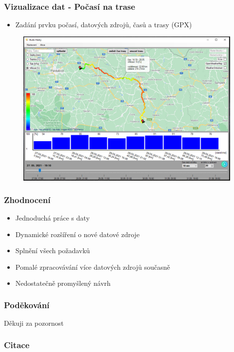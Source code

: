 \documentclass{beamer}
\begin{document}
	\begin{frame}
		\frametitle{Vizualizace dat - Počasí na trase}
		
		\begin{itemize}
			\item Zadání prvku počasí, datových zdrojů, časů a trasy (GPX)
		\end{itemize}
	
		\begin{figure}
			
			\includegraphics[scale=0.35]{figures/trasa počasí.png}
			
		\end{figure}
		
	\end{frame}

	\begin{frame}
		\frametitle{Zhodnocení}
		
		\begin{itemize}
			\item Jednoduchá práce s daty
			\item Dynamické rozšíření o nové datové zdroje
			\item Splnění všech požadavků
			\item Pomalé zpracovávání více datových zdrojů současně
			\item Nedostatečně promyšlený návrh
		\end{itemize}
	\end{frame}

	\begin{frame}
		\frametitle{Poděkování}
		
		\begin{center}
			\Huge
			Děkuji za pozornost
		\end{center}
		
	\end{frame}

	\begin{frame}
		\frametitle{Citace}
		
		\nocite{*}
		
		\printbibliography
		
	\end{frame}
	
\end{document}
